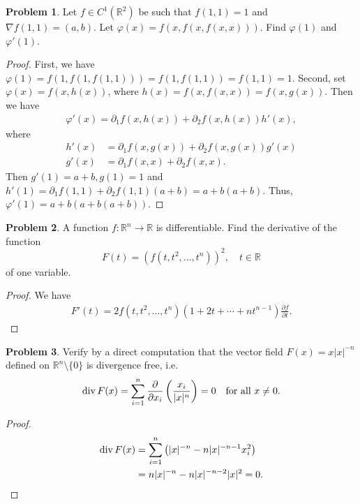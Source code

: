 \documentclass[11pt]{article}
\theoremstyle{definition}
\newtheorem{problem}{Problem}
\theoremstyle{definition}
\begin{document}
\medskip

\begin{problem}
Let $f\in C^1(\mathbb{R}^2)$ be such that $f(1,1)=1$ and $\nabla f(1,1)=(a,b)$.
Let $\varphi(x)=f(x,f(x,f(x,x)))$. Find $\varphi(1)$ and $\varphi'(1)$.
\end{problem}
\begin{proof}
First, we have $\varphi(1) = f(1,f(1,f(1,1))) = f(1,f(1,1)) = f(1,1) = 1$. Second, set $\varphi(x) = f(x, h(x))$, where $h(x) = f(x, f(x,x)) = f(x,g(x))$. Then we have
\begin{align*}
    \varphi'(x) = \partial_1 f(x, h(x)) + \partial_2 f(x, h(x)) h'(x),
\end{align*}
where 
\begin{align*}
    h'(x) & = \partial_1 f(x,g(x)) + \partial_2 f(x,g(x)) g'(x) \\
    g'(x) & = \partial_1 f(x,x) + \partial_2 f(x,x) .
\end{align*}
Then $g'(1) = a+b, g(1) = 1$ and $h'(1) = \partial_1 f(1,1) + \partial_2 f(1,1) (a+b) =a + b(a+b)$. Thus, $\varphi'(1) = a + b (a + b(a+b))$.
\end{proof}

\medskip

\begin{problem}
A function $f:\mathbb{R}^n\to\mathbb{R}$ is differentiable. Find the derivative of the function
$$
F(t)=(f(t,t^2,\ldots,t^n))^2,\quad t\in\mathbb{R}
$$
of one variable.
\end{problem}
\begin{proof}
We have
\begin{align*}
    F'(t) = 2 f(t,t^2,\ldots,t^n) (1 + 2t + \cdots + n t^{n-1}) \frac{\partial f}{\partial t}.
\end{align*}
\end{proof}

\medskip

\begin{problem}
Verify by a direct computation that the vector field $F(x)=x|x|^{-n}$ defined on
$\mathbb{R}^n\setminus\{0\}$ is divergence free, i.e.
$$
{\rm div}\, F(x)=\sum_{i=1}^n \frac{\partial}{\partial x_i}\left(\frac{x_i}{|x|^n}\right) = 0
\quad
\mbox{for all $x\neq 0$.}
$$
\end{problem}
\begin{proof}
\begin{align*}
    {\rm div}\, F(x) & = \sum^n_{i=1} \left(|x|^{-n} - n |x|^{-n-1} x_i^2\right) \\
    & = n |x|^{-n} - n |x|^{-n-2} |x|^2 = 0.
\end{align*}
\end{proof}
\end{document}
